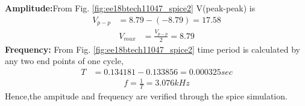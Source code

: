 \begin{enumerate}[label=\arabic*.,ref=\theenumi]
\renewcommand{\thefigure}{\theenumi}
%
\textbf{Amplitude:}From Fig. \ref{fig:ee18btech11047_spice2} V(peak-peak) is 
\begin{align}
V_{p-p} &= 8.79-(-8.79)= 17.58
\end{align}
\begin{align}
V_{max} &= \frac{V_{p-p}}{2} = 8.79
\end{align}
\textbf{Frequency:} From Fig. \ref{fig:ee18btech11047_spice2} time period is calculated by any two end points of one cycle,
\begin{align}
T&=0.134181-0.133856 = 0.000325 sec
\end{align}
\begin{align}
f = \frac{1}{T} = 3.076 kHz
\end{align}
Hence,the ampitude and frequency are verified through the spice simulation.
\end{enumerate}
